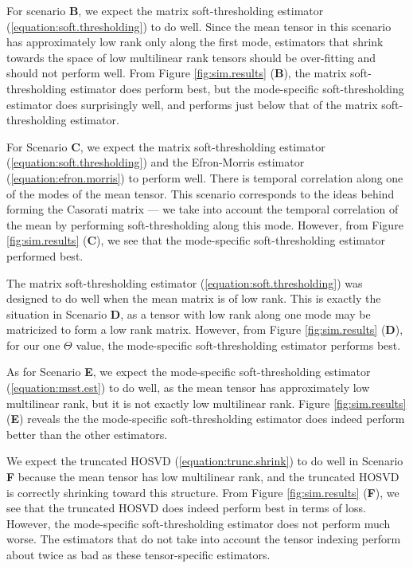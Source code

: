 For scenario \textbf{B}, we expect the matrix soft-thresholding
estimator (\ref{equation:soft.thresholding}) to do well. Since the mean tensor in this scenario has approximately low rank only along the first mode,
estimators that shrink towards the space of low multilinear rank tensors should be
over-fitting and should not perform well. From Figure \ref{fig:sim.results} (\textbf{B}), the matrix
soft-thresholding estimator does perform best, but the mode-specific
soft-thresholding estimator does surprisingly well, and performs just
below that of the matrix soft-thresholding estimator.

For Scenario \textbf{C}, we expect the matrix soft-thresholding
estimator (\ref{equation:soft.thresholding}) and the
Efron-Morris estimator (\ref{equation:efron.morris}) to perform well. There is temporal correlation along one of the
modes of the mean tensor. This scenario corresponds to the ideas behind forming
the Casorati matrix --- we take into account the temporal correlation of the mean by
performing soft-thresholding along this mode. However, from Figure \ref{fig:sim.results} (\textbf{C}), we see that the mode-specific soft-thresholding
estimator performed best. 

The matrix soft-thresholding estimator (\ref{equation:soft.thresholding}) was designed to do well when the mean matrix is of low rank. This is exactly the situation in Scenario \textbf{D}, as a tensor with low rank along one mode may be matricized to form a low rank matrix. However, from Figure \ref{fig:sim.results} (\textbf{D}), for our one $\Theta$ value, the mode-specific soft-thresholding estimator performs best.

As for Scenario \textbf{E}, we expect the mode-specific
soft-thresholding estimator (\ref{equation:msst.est}) to do well, as the mean tensor has
approximately low multilinear rank, but it is not exactly low multilinear rank. Figure \ref{fig:sim.results} (\textbf{E}) reveals the the
mode-specific soft-thresholding estimator does indeed perform better than the
other estimators.

We expect the truncated HOSVD (\ref{equation:trunc.shrink}) to do well in Scenario \textbf{F} because the
mean tensor has low multilinear rank, and the truncated HOSVD is correctly
shrinking toward this structure. From Figure \ref{fig:sim.results} (\textbf{F}), we
see that the truncated HOSVD does indeed perform best in terms of
loss. However, the
mode-specific soft-thresholding estimator does not perform much
worse. The estimators that do not take into account the tensor indexing
perform about twice as bad as these tensor-specific estimators.

